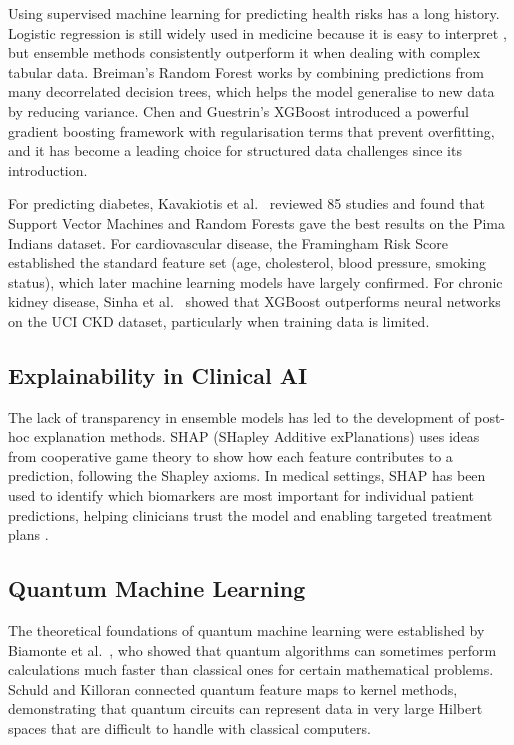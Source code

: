 ﻿\documentclass[conference]{IEEEtran}
\begin{document}
Using supervised machine learning for predicting health risks has a long history.
Logistic regression is still widely used in medicine because it is easy to interpret
\cite{hosmer2013logistic}, but ensemble methods consistently outperform it when dealing
with complex tabular data. Breiman's Random Forest \cite{breiman2001rf} works by
combining predictions from many decorrelated decision trees, which helps the model
generalise to new data by reducing variance. Chen and Guestrin's XGBoost
\cite{chen2016xgboost} introduced a powerful gradient boosting framework with
regularisation terms that prevent overfitting, and it has become a leading choice for
structured data challenges since its introduction.

For predicting diabetes, Kavakiotis et al.\ \cite{kavakiotis2017ml} reviewed 85 studies
and found that Support Vector Machines and Random Forests gave the best results on the
Pima Indians dataset. For cardiovascular disease, the Framingham Risk Score
\cite{wilson1998framingham} established the standard feature set (age, cholesterol,
blood pressure, smoking status), which later machine learning models have largely
confirmed. For chronic kidney disease, Sinha et al.\ \cite{sinha2019ckd} showed that
XGBoost outperforms neural networks on the UCI CKD dataset, particularly when training
data is limited.

\subsection{Explainability in Clinical AI}

The lack of transparency in ensemble models has led to the development of post-hoc
explanation methods. SHAP (SHapley Additive exPlanations) \cite{lundberg2017shap} uses
ideas from cooperative game theory to show how each feature contributes to a prediction,
following the Shapley axioms. In medical settings, SHAP has been used to identify which
biomarkers are most important for individual patient predictions, helping clinicians trust
the model and enabling targeted treatment plans \cite{lundberg2020trees}.

\subsection{Quantum Machine Learning}

The theoretical foundations of quantum machine learning were established by Biamonte
et al.\ \cite{biamonte2017qml}, who showed that quantum algorithms can sometimes perform
calculations much faster than classical ones for certain mathematical problems. Schuld
and Killoran \cite{schuld2019qml} connected quantum feature maps to kernel methods,
demonstrating that quantum circuits can represent data in very large Hilbert spaces that
are difficult to handle with classical computers.
\end{document}
